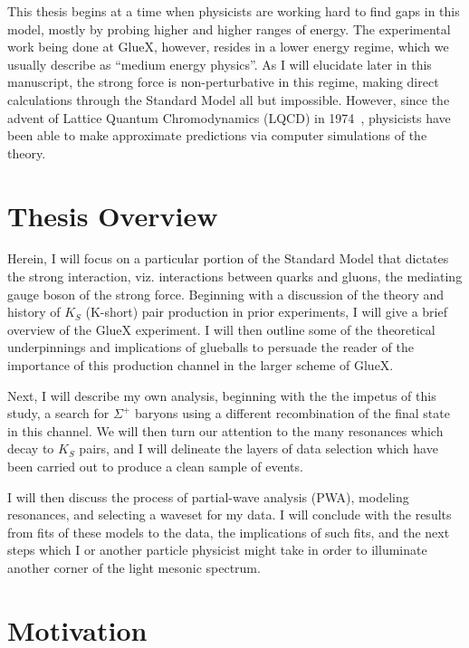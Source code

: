 This thesis begins at a time when physicists are working hard to find gaps in this model, mostly by probing higher and higher ranges of energy. The experimental work being done at GlueX, however, resides in a lower energy regime, which we usually describe as ``medium energy physics''. As I will elucidate later in this manuscript, the strong force is non-perturbative in this regime, making direct calculations through the Standard Model all but impossible. However, since the advent of Lattice Quantum Chromodynamics (LQCD) in 1974~\cite{Wilson1974}, physicists have been able to make approximate predictions via computer simulations of the theory.

\section{Thesis Overview}\label{sec:thesis_overview}

Herein, I will focus on a particular portion of the Standard Model that dictates the strong interaction, viz. interactions between quarks and gluons, the mediating gauge boson of the strong force. Beginning with a discussion of the theory and history of $K_S$ (K-short) pair production in prior experiments, I will give a brief overview of the GlueX experiment. I will then outline some of the theoretical underpinnings and implications of glueballs to persuade the reader of the importance of this production channel in the larger scheme of GlueX.

Next, I will describe my own analysis, beginning with the the impetus of this study, a search for $\Sigma^+$ baryons using a different recombination of the final state in this channel. We will then turn our attention to the many resonances which decay to $K_S$ pairs, and I will delineate the layers of data selection which have been carried out to produce a clean sample of events.

I will then discuss the process of partial-wave analysis (PWA), modeling resonances, and selecting a waveset for my data. I will conclude with the results from fits of these models to the data, the implications of such fits, and the next steps which I or another particle physicist might take in order to illuminate another corner of the light mesonic spectrum.

\section{Motivation}\label{sec:motivation}

